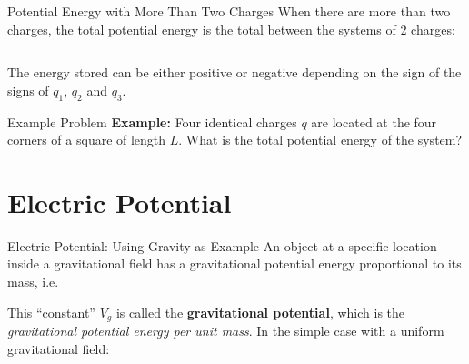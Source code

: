 \documentclass[12pt,aspectratio=169]{beamer}
\begin{document}
\begin{frame}{Potential Energy with More Than Two Charges}
  When there are more than two charges, the total potential energy is the
  total between the systems of 2 charges:

  \vspace{.1in}
  \begin{columns}

  \end{columns}
  
  \vspace{.1in}The energy stored can be either positive or negative depending
  on the sign of the signs of $q_1$, $q_2$ and $q_3$.
\end{frame}



\begin{frame}{Example Problem}
  \textbf{Example:} Four identical charges $q$ are located at the four corners
  of a square of length $L$. What is the total potential energy of the system?
  \begin{center}
  \end{center}
\end{frame}



\section{Electric Potential}

\begin{frame}{Electric Potential: Using Gravity as Example}
  An object at a specific location inside a gravitational field has a
  gravitational potential energy proportional to its mass, i.e.\

  
  This ``constant'' $V_g$ is called the \textbf{gravitational potential}, which
  is the \emph{gravitational potential energy per unit mass}. In the simple
  case with a uniform gravitational field:


\end{frame}
\end{document}
